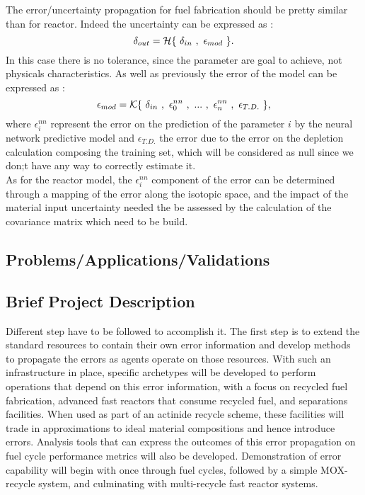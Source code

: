 \documentclass[dvips,12pt]{article}
\begin{document}
The error/uncertainty propagation for fuel fabrication should be pretty similar than for reactor. Indeed the uncertainty can be expressed as :
\begin{equation}
\delta_{out} = {\cal H}\{~\delta _{in}~,~\epsilon_{mod}~\}.
\end{equation}
In this case there is no tolerance, since the parameter are goal to achieve, not physicals characteristics. As well as previously the error of the model can be expressed as :
\begin{equation}
\epsilon_{mod} = {\cal K}\{~\delta _{in}~,~\epsilon^{nn}_{0}~,~...~,~\epsilon^{nn}_{n}~,~\epsilon_{T.D.}~\},
\end{equation}
 where $\epsilon^{nn}_{i}$ represent the error on the prediction of the parameter $i$ by the neural network predictive model and $\epsilon_{T.D.}$ the error due to the error on the depletion calculation composing the training set, which will be considered as null since we don;t have any way to correctly estimate it.\\
 
 As for the reactor model, the $\epsilon^{nn}_{i}$ component of the error can be determined through a mapping of the error along the isotopic space, and the impact of the material input uncertainty needed the be assessed by the calculation of the covariance matrix which need to be build.




\subsection{Problems/Applications/Validations}



\subsection{Brief Project Description}
Different step have to be followed to accomplish it.
The first step is to extend the standard resources to contain their own error information and develop methods to propagate the errors as agents operate on those resources. With such an infrastructure in place, specific archetypes will be developed to perform operations that depend on this error information, with a focus on recycled fuel fabrication, advanced fast reactors that consume recycled fuel, and separations facilities. 
When used as part of an actinide recycle scheme, these facilities will trade in approximations to ideal material compositions and hence introduce errors. 
Analysis tools that can express the outcomes of this error propagation on fuel cycle performance metrics will also be developed. Demonstration of error capability will begin with once through fuel cycles, followed by a simple MOX-recycle system, and culminating with multi-recycle fast reactor systems.
\end{document}
